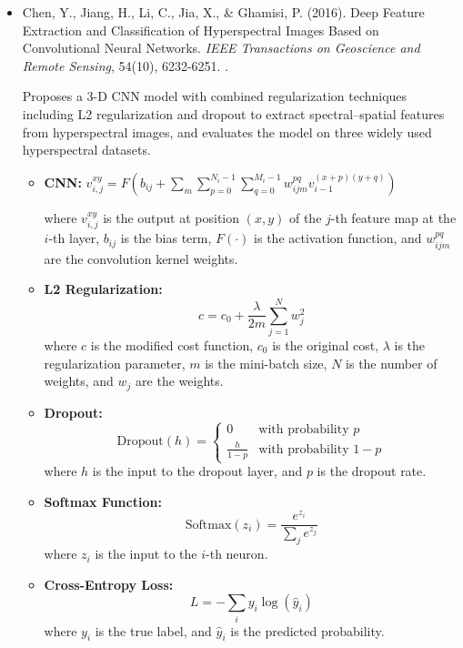 \documentclass[10pt,svgnames,fragile]{beamer}
\begin{document}
\begin{frame}
\tiny
\begin{itemize}

    \item Chen, Y., Jiang, H., Li, C., Jia, X., \& Ghamisi, P. (2016). Deep Feature Extraction and Classification of Hyperspectral Images Based on Convolutional Neural Networks. \textit{IEEE Transactions on Geoscience and Remote Sensing}, 54(10), 6232-6251. \href{https://doi.org/10.1109/TGRS.2016.2584107}{\color{blue}{DOI: 10.1109/TGRS.2016.2584107}}. \cite{chenDeepFeatureExtraction2016}

    {\color{gray}Proposes a 3-D CNN model with combined regularization techniques including L2 regularization and dropout to extract spectral–spatial features from hyperspectral images, and evaluates the model on three widely used hyperspectral datasets.}
    \begin{itemize} \tiny
    \item \textbf{CNN:}
    \(
    v_{i,j}^{xy} = F \left( b_{ij} + \sum_{m} \sum_{p=0}^{N_i-1} \sum_{q=0}^{M_i-1} w_{ijm}^{pq} v_{i-1}^{(x+p)(y+q)} \right)
    \)
    
    where \( v_{i,j}^{xy} \) is the output at position \((x, y)\) of the \(j\)-th feature map at the \(i\)-th layer, \(b_{ij}\) is the bias term, \(F(\cdot)\) is the activation function, and \(w_{ijm}^{pq}\) are the convolution kernel weights.

    \item \textbf{L2 Regularization:}
    \[
    c = c_0 + \frac{\lambda}{2m} \sum_{j=1}^{N} w_j^2
    \]
    where \( c \) is the modified cost function, \( c_0 \) is the original cost, \( \lambda \) is the regularization parameter, \( m \) is the mini-batch size, \( N \) is the number of weights, and \( w_j \) are the weights.

    \item \textbf{Dropout:}
    \[
    \text{Dropout}(h) = \begin{cases} 
    0 & \text{with probability } p \\
    \frac{h}{1-p} & \text{with probability } 1-p 
    \end{cases}
    \]
    where \( h \) is the input to the dropout layer, and \( p \) is the dropout rate.
    
    \item \textbf{Softmax Function:}
    \[
    \text{Softmax}(z_i) = \frac{e^{z_i}}{\sum_{j} e^{z_j}}
    \]
    where \( z_i \) is the input to the \( i \)-th neuron.

    \item \textbf{Cross-Entropy Loss:}
    \[
    L = -\sum_{i} y_i \log(\hat{y}_i)
    \]
    where \( y_i \) is the true label, and \( \hat{y}_i \) is the predicted probability.
\end{itemize}

\end{itemize}
\end{frame}
\end{document}

